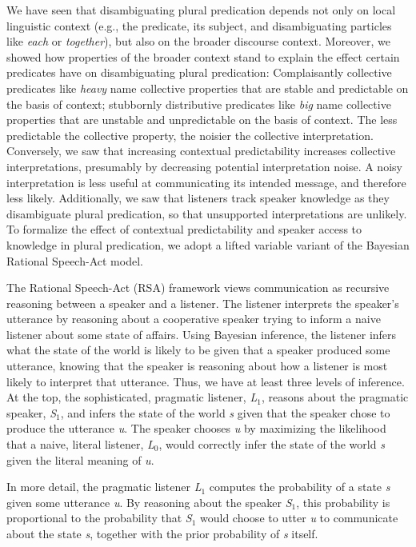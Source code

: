 \documentclass[linguex]{sp}
\begin{document}
We have seen that disambiguating plural predication depends not only on local linguistic context (e.g., the predicate, its subject, and disambiguating particles like \emph{each} or \emph{together}), but also on the broader discourse context. Moreover, we showed how properties of the broader context stand to explain the effect certain predicates have on disambiguating plural predication: Complaisantly collective predicates like \emph{heavy} name collective properties that are stable and predictable on the basis of context; stubbornly distributive predicates like \emph{big} name collective properties that are unstable and unpredictable on the basis of context. The less predictable the collective property, the noisier the collective interpretation. Conversely, we saw that increasing contextual predictability increases collective interpretations, presumably by decreasing potential interpretation noise. A noisy interpretation is less useful at communicating its intended message, and therefore less likely. Additionally, we saw that listeners track speaker knowledge as they disambiguate plural predication, so that unsupported interpretations are unlikely. To formalize the effect of contextual predictability and speaker access to knowledge in plural predication, we adopt a lifted variable variant of the Bayesian Rational Speech-Act model. 

The Rational Speech-Act (RSA) framework views communication as recursive reasoning between a speaker and a listener. The listener interprets the speaker's utterance by reasoning about a cooperative speaker trying to inform a naive listener about some state of affairs. Using Bayesian inference, the listener infers what the state of the world is likely to be given that a speaker produced some utterance, knowing that the speaker is reasoning about how a listener is most likely to interpret that utterance. Thus, we have at least three levels of inference. At the top, the sophisticated, pragmatic listener, \emph{L}$_{1}$, reasons about the pragmatic speaker, \emph{S}$_{1}$, and infers the state of the world \emph{s} given that the speaker chose to produce the utterance \emph{u}. The speaker chooses \emph{u} by maximizing the likelihood that a naive, literal listener, \emph{L}$_{0}$, would correctly infer the state of the world \emph{s} given the literal meaning of \emph{u}.

In more detail, the pragmatic listener \emph{L}$_{1}$ computes the probability of a state \emph{s} given some utterance \emph{u}. By reasoning about the speaker \emph{S}$_{1}$, this probability is proportional to the probability that \emph{S}$_{1}$ would choose to utter \emph{u} to communicate about the state \emph{s}, together with the prior probability of \emph{s} itself.
\end{document}

